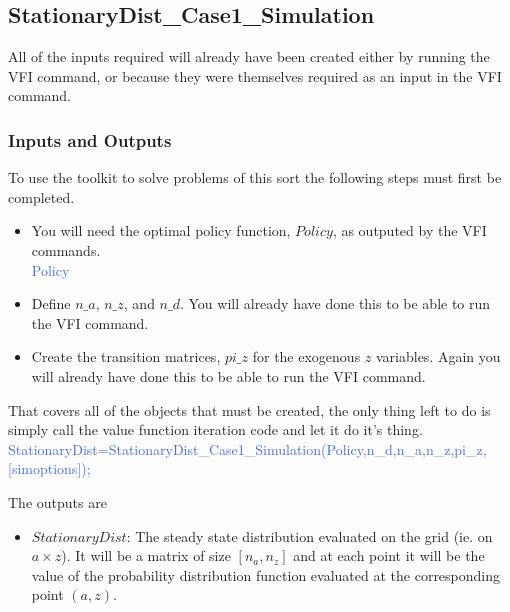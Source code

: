 \subsection{StationaryDist\_{}Case1\_{}Simulation}
All of the inputs required will already have been created either by running the VFI command, or because they were themselves required as an 
input in the VFI command.

\subsubsection{Inputs and Outputs}
To use the toolkit to solve problems of this sort the following steps must first be completed.
\begin{itemize}
 \item You will need the optimal policy function, $Policy$, as outputed by the VFI commands. \\
    \textcolor{RoyalBlue}{Policy}
 \item Define $n\_{}a$, $n\_{}z$, and $n\_{}d$. You will already have done this to be able to run the VFI command.
 \item Create the transition matrices, $pi\_{}z$ for the exogenous $z$ variables. Again you will already have done this to be able to run the VFI command.
\end{itemize}

That covers all of the objects that must be created, the only thing left to do is simply call the value function iteration code and let it do it's thing. \\
\textcolor{RoyalBlue}{StationaryDist=StationaryDist\_{}Case1\_{}Simulation(Policy,n\_{}d,n\_{}a,n\_{}z,pi\_{}z, [simoptions]);}

The outputs are
\begin{itemize}
 \item $StationaryDist$: The steady state distribution evaluated on the grid (ie. on $a \times z$). It will be a matrix of size $[n_a,n_z]$ and at each point 
    it will be the value of the probability distribution function evaluated at the corresponding point $(a,z)$.
\end{itemize}


